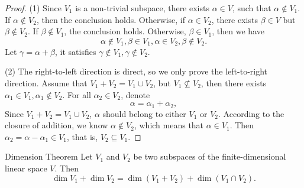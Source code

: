 \begin{proof}
  (1) Since $V_1$ is a non-trivial subspace, there exists $\alpha \in V$,
  such that $\alpha \not\in V_1$. If $\alpha \not \in V_2$, then the conclusion
  holds.
  Otherwise, if $\alpha \in V_2$, there exists $\beta \in V$ but
  $\beta \not\in V_2$.
  If $\beta \not \in V_1$, the conclusion holds. Otherwise, $\beta \in V_1$,
  then we have
  \begin{equation}
    \alpha \not\in V_1, \beta \in V_1, \alpha \in V_2, \beta \not \in V_2.
  \end{equation}
  Let $\gamma = \alpha + \beta$, it satisfies $\gamma \not \in V_1, \gamma \not \in V_2$.

  (2) The right-to-left direction is direct, so we only prove the left-to-right direction.
  Assume that $V_1 + V_2 = V_1 \cup V_2$, but $V_1 \not\subseteq V_2$,
  then there exists $\alpha_1 \in V_1, \alpha_1 \not \in V_2$.
  For all $\alpha_2 \in V_2$, denote
  \begin{equation}
    \alpha = \alpha_1 + \alpha_2,
  \end{equation}
  Since $V_1 + V_2 = V_1 \cup V_2$,
  $\alpha$ should belong to either $V_1$ or $V_2$.
  According to the closure of addition, we know $\alpha \not \in V_2$,
  which means that $\alpha \in V_1$.
  Then $\alpha_2 = \alpha - \alpha_1 \in V_1$, that is,
  $V_2 \subseteq V_1$.
\end{proof}

\begin{theorem}{Dimension Theorem}{}
  Let $V_1$ and $V_2$ be two subspaces of the finite-dimensional linear space
  $V$. Then
  \begin{equation}
    \dim V_1 + \dim V_2 = \dim (V_1 + V_2) + \dim (V_1 \cap V_2).
  \end{equation}
\end{theorem}

